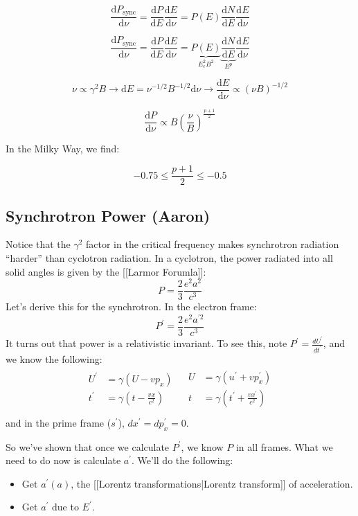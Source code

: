 \documentclass{article}
\def\xp{{x^{\prime}}}
\begin{document}
$$
\frac{\mathrm{d}P_\text{sync}}{\mathrm{d}\nu} = \frac{\mathrm{d}P}{\mathrm{d}E}\frac{\mathrm{d}E}{\mathrm{d}\nu} = P(E) \frac{\mathrm{d}N}{\mathrm{d}E}\frac{\mathrm{d}E}{\mathrm{d}\nu}
$$

$$
\frac{\mathrm{d}P_\text{sync}}{\mathrm{d}\nu} = \frac{\mathrm{d}P}{\mathrm{d}E}\frac{\mathrm{d}E}{\mathrm{d}\nu} = \underbrace{P(E)}_{E_e^2 B^2} \underbrace{\frac{\mathrm{d}N}{\mathrm{d}E}}_{E^p}\frac{\mathrm{d}E}{\mathrm{d}\nu}
$$

$$
\nu \propto \gamma^2 B \to \mathrm{d}E = \nu^{-1/2}B^{-1/2} \mathrm{d}\nu \rightarrow \frac{\mathrm{d}E}{\mathrm{d}\nu} \propto \left(\nu B\right)^{-1/2}
$$

$$
\boxed{\frac{\mathrm{d}P}{\mathrm{d}\nu} \propto B \left(\frac{\nu}{B}\right)^{\frac{p+1}{2}}}
$$

In the Milky Way, we find:

$$
-0.75 \leq \frac{p+1}{2} \leq -0.5
$$

\subsection{Synchrotron Power (Aaron)}

Notice that the $\gamma^2$ factor in the critical frequency makes synchrotron radiation ``harder'' than
cyclotron radiation.  In a cyclotron, the power radiated into all solid
angles is given by the [[Larmor Forumla]]:
$$P=\frac{2}{3}\frac{e^2a^2}{ c^3}$$
Let's derive this for the synchrotron.  In the electron frame:
$$P^\prime=\frac{2}{3}\frac{e^2a^{\prime 2}}{ c^3}$$
It turns out that power is a relativistic invariant.  To see this, note
$P^\prime=\frac{dU^\prime}{ dt^\prime}$, and we know the following:
$$\begin{matrix}
\begin{aligned} U^\prime&=\gamma(U-vp_x)\\ 
t^\prime&=\gamma(t-\frac{vx}{ c^2})\\ \end{aligned}&
\begin{aligned} U&=\gamma(u^\prime+vp_x^\prime)\\ 
t&=\gamma(t^\prime+\frac{v\xp}{ c^2})\\ \end{aligned}
\end{matrix}$$
and in the prime frame  ($s^\prime$), $d\xp=dp_x^\prime=0$.\par
So we've shown that once we calculate $P^\prime$, we know $P$ in all frames.
What we need to do now is calculate $a^\prime$.  We'll do the following:
\begin{itemize}
\item  Get $a^\prime(a)$, the [[Lorentz transformations|Lorentz transform]] of acceleration.
\item  Get $a^\prime$ due to $E^\prime$.
\end{itemize}
\end{document}
